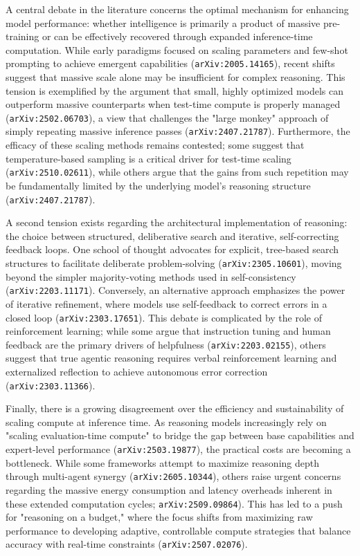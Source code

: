 \documentclass[11pt]{article}
\begin{document}
A central debate in the literature concerns the optimal mechanism for enhancing model performance: whether intelligence is primarily a product of massive pre-training or can be effectively recovered through expanded inference-time computation. While early paradigms focused on scaling parameters and few-shot prompting to achieve emergent capabilities (\texttt{arXiv:2005.14165}), recent shifts suggest that massive scale alone may be insufficient for complex reasoning. This tension is exemplified by the argument that small, highly optimized models can outperform massive counterparts when test-time compute is properly managed (\texttt{arXiv:2502.06703}), a view that challenges the "large monkey" approach of simply repeating massive inference passes (\texttt{arXiv:2407.21787}). Furthermore, the efficacy of these scaling methods remains contested; some suggest that temperature-based sampling is a critical driver for test-time scaling (\texttt{arXiv:2510.02611}), while others argue that the gains from such repetition may be fundamentally limited by the underlying model's reasoning structure (\texttt{arXiv:2407.21787}).

A second tension exists regarding the architectural implementation of reasoning: the choice between structured, deliberative search and iterative, self-correcting feedback loops. One school of thought advocates for explicit, tree-based search structures to facilitate deliberate problem-solving (\texttt{arXiv:2305.10601}), moving beyond the simpler majority-voting methods used in self-consistency (\texttt{arXiv:2203.11171}). Conversely, an alternative approach emphasizes the power of iterative refinement, where models use self-feedback to correct errors in a closed loop (\texttt{arXiv:2303.17651}). This debate is complicated by the role of reinforcement learning; while some argue that instruction tuning and human feedback are the primary drivers of helpfulness (\texttt{arXiv:2203.02155}), others suggest that true agentic reasoning requires verbal reinforcement learning and externalized reflection to achieve autonomous error correction (\texttt{arXiv:2303.11366}).

Finally, there is a growing disagreement over the efficiency and sustainability of scaling compute at inference time. As reasoning models increasingly rely on "scaling evaluation-time compute" to bridge the gap between base capabilities and expert-level performance (\texttt{arXiv:2503.19877}), the practical costs are becoming a bottleneck. While some frameworks attempt to maximize reasoning depth through multi-agent synergy (\texttt{arXiv:2605.10344}), others raise urgent concerns regarding the massive energy consumption and latency overheads inherent in these extended computation cycles; \texttt{arXiv:2509.09864}). This has led to a push for "reasoning on a budget," where the focus shifts from maximizing raw performance to developing adaptive, controllable compute strategies that balance accuracy with real-time constraints (\texttt{arXiv:2507.02076}).
\end{document}
